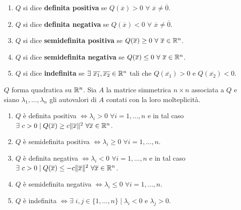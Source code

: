 \begin{definition}
	\begin{enumerate}
		\item $Q$ si dice \textbf{definita positiva} se $Q(\overline{x}) >0\,\, \forall\,\, \overline{x} \neq \overline{0}$.
		
		\item $Q$ si dice \textbf{definita negativa} se $Q(\overline{x})<0 \,\, \forall \,\, \overline{x} \neq \overline{0}$.
		
		\item $Q$ si dice \textbf{semidefinita positiva} se $Q(\overline{x})\geq 0 \,\, \forall \,\, \overline{x} \in \mathbb{R}^n$.
		
		\item $Q$ si dice \textbf{semidefinita negativa} se $Q(\overline{x})\leq 0 \,\, \forall \,\, \overline{x} \in \mathbb{R}^n$.
		
		\item $Q$ si dice \textbf{indefinita} se $\exists \,\,\overline{x_1},\overline{x_2}\in \mathbb{R}^{n}$ tali che $Q(\overline{x_1})>0$ e $Q(\overline{x_2})<0$.
	\end{enumerate}
\end{definition}


\begin{proposition}
	$Q$ forma quadratica su $\mathbb{R}^n$. Sia $A$ la matrice simmetrica $n \times n$ associata a $Q$ e siano $\lambda_1,...,\lambda_n$ gli autovalori di $A$ contati con la loro molteplicità.
	\begin{enumerate}
		\item $Q$ è definita positiva $\Leftrightarrow \lambda_i >0 \,\, \forall i =1,...,n$ e in tal caso $\exists \,\, c >0 \mid Q(\overline{x})\geq c\|\overline{x}\|^2\,\, \forall \overline{x} \in \mathbb{R}^n$.
		\item $Q$ è semidefinita positiva $\Leftrightarrow \lambda_i \geq 0 \,\, \forall i=1,...,n$.
		\item $Q$ è definita negativa $\Leftrightarrow \lambda_i <0 \,\, \forall i =1,...,n$ e in tal caso $\exists \,\, c >0 \mid Q(\overline{x})\leq -c\|\overline{x}\|^2\,\, \forall \overline{x} \in \mathbb{R}^n$.
		\item $Q$ è semidefinita negativa $\Leftrightarrow \lambda_i \leq 0 \,\, \forall i=1,...,n$.
		\item $Q$ è indefinita $\Leftrightarrow \exists\,\, i,j \in \{1,...,n\} \mid \lambda_i <0$ e $\lambda_j>0$.
	\end{enumerate}
\end{proposition}


